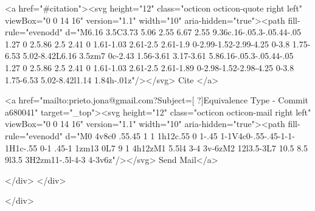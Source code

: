       <a  href="#citation"><svg height="12" class="octicon octicon-quote right left" viewBox="0 0 14 16" version="1.1" width="10" aria-hidden="true"><path fill-rule="evenodd" d="M6.16 3.5C3.73 5.06 2.55 6.67 2.55 9.36c.16-.05.3-.05.44-.05 1.27 0 2.5.86 2.5 2.41 0 1.61-1.03 2.61-2.5 2.61-1.9 0-2.99-1.52-2.99-4.25 0-3.8 1.75-6.53 5.02-8.42L6.16 3.5zm7 0c-2.43 1.56-3.61 3.17-3.61 5.86.16-.05.3-.05.44-.05 1.27 0 2.5.86 2.5 2.41 0 1.61-1.03 2.61-2.5 2.61-1.89 0-2.98-1.52-2.98-4.25 0-3.8 1.75-6.53 5.02-8.42l1.14 1.84h-.01z"/></svg> Cite
      </a>

      <a href="mailto:prieto.jona@gmail.com?Subject=[ ?]Equivalence Type - Commit a680041" target="_top"><svg height="12" class="octicon octicon-mail right left" viewBox="0 0 14 16" version="1.1" width="10" aria-hidden="true"><path fill-rule="evenodd" d="M0 4v8c0 .55.45 1 1 1h12c.55 0 1-.45 1-1V4c0-.55-.45-1-1-1H1c-.55 0-1 .45-1 1zm13 0L7 9 1 4h12zM1 5.5l4 3-4 3v-6zM2 12l3.5-3L7 10.5 8.5 9l3.5 3H2zm11-.5l-4-3 4-3v6z"/></svg> Send Mail</a>

    </div>
  </div>

</div>




